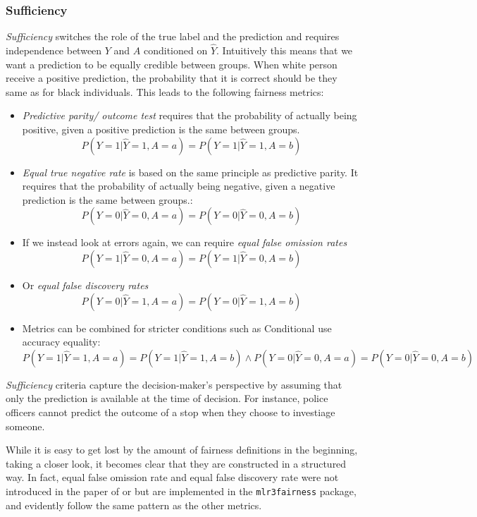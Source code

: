 \subsubsection*{Sufficiency}
\textit{Sufficiency} switches the role of the true label and the prediction and requires independence between $Y$ and $A$ conditioned on $\hat{Y}$. Intuitively this means that we want a prediction to be equally credible between groups. When white person receive a positive prediction, the probability that it is correct should be they same as for black individuals. This leads to the following fairness metrics:
\begin{itemize}
    \item \textit{Predictive parity/ outcome test} requires that the probability of actually being positive, given a positive prediction is the same between groups. $$P(Y = 1 | \hat{Y} = 1, A = a) = P(Y = 1 | \hat{Y} = 1, A = b)$$
    \item \textit{Equal true negative rate} is based on the same principle as predictive parity. It requires that the probability of actually being negative, given a negative prediction is the same between groups.: $$P(Y = 0 | \hat{Y} = 0, A = a) = P(Y = 0 | \hat{Y} = 0, A = b)$$
    \item If we instead look at errors again, we can require \textit{equal false omission rates} $$P(Y = 1 | \hat{Y} = 0, A = a) = P(Y = 1 | \hat{Y} = 0, A = b)$$
    \item Or \textit{equal false discovery rates} $$P(Y = 0 | \hat{Y} = 1, A = a) = P(Y = 0 | \hat{Y} = 1, A = b)$$
    \item Metrics can be combined for stricter conditions such as Conditional use accuracy equality: $P(Y = 1 | \hat{Y} = 1, A = a) = P(Y = 1 | \hat{Y} = 1, A = b) \land P(Y = 0 | \hat{Y} = 0, A = a) = P(Y = 0 | \hat{Y} = 0, A = b)$
\end{itemize}

\textit{Sufficiency} criteria capture the decision-maker's perspective by assuming that only the prediction is available at the time of decision. For instance, police officers cannot predict the outcome of a stop when they choose to investiage someone.\par
While it is easy to get lost by the amount of fairness definitions in the beginning, taking a closer look, it becomes clear that they are constructed in a structured way. In fact, equal false omission rate and equal false discovery rate were not introduced in the paper of \cite{verma2018} or \cite{castelnovo2022} but are implemented in the \texttt{mlr3fairness} package, and evidently follow the same pattern as the other metrics.

